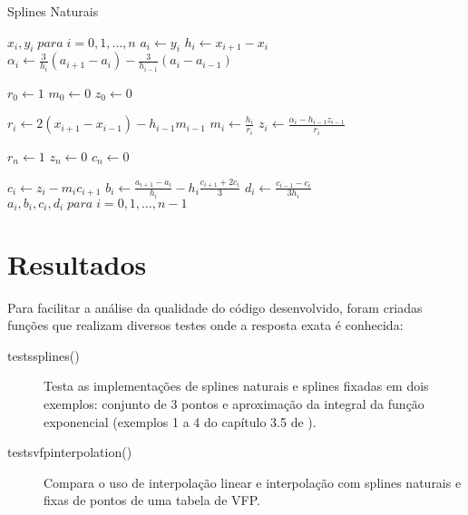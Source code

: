\documentclass[final,5p]{elsarticle}
\numberwithin{equation}{section}
\begin{document}
        \begin{algorithm}
            \caption{Splines Naturais}\label{alg:splines}
            \begin{algorithmic}
                \Require $x_i,y_i \; para \; i=0,1,\ldots,n$
                    \State $a_i \gets y_i$
                \EndFor
                    \State $h_i \gets x_{i+1} - x_i$
                \EndFor
                    \State $\alpha_i \gets \frac{3}{h_i} (a_{i+1}-a_i) - \frac{3}{h_{i-1}} (a_i-a_{i-1})$
                \EndFor
                
                \State $r_0 \gets 1$
                \State $m_0 \gets 0$
                \State $z_0 \gets 0$
                
                    \State $r_i \gets 2 (x_{i+1} - x_{i-1}) - h_{i-1} m_{i-1}$
                    \State $m_i \gets \frac{h_i}{r_i}$
                    \State $z_i \gets \frac{\alpha_i - h_{i-1} z_{i-1}}{r_i}$
                \EndFor
                
                \State $r_n \gets 1$
                \State $z_n \gets 0$
                \State $c_n \gets 0$
                
                    \State $c_i \gets z_i - m_i c_{i+1}$
                    \State $b_i \gets \frac{a_{i+1} - a_i}{h_i} - h_i \frac{c_{i+1} + 2 c_i}{3}$
                    \State $d_i \gets \frac{c_{i-1} - c_i}{3 h_i}$
                \EndFor
                \State \Return $a_i,b_i,c_i,d_i \; para \; i=0,1,\ldots,n-1$
            \end{algorithmic}
        \end{algorithm}
    
    \section{Resultados}
    
        Para facilitar a análise da qualidade do código desenvolvido, foram criadas funções que realizam diversos testes onde a resposta exata é conhecida:

        \begin{description}
            \item[tests\textunderscore splines()] Testa as implementações de splines naturais e splines fixadas em dois exemplos: conjunto de 3 pontos e aproximação da integral da função exponencial (exemplos 1 a 4 do capítulo 3.5 de \cite{burden2016analise}).
            
            \item[tests\textunderscore vfp\textunderscore interpolation()] Compara o uso de interpolação linear e interpolação com splines naturais e fixas de pontos de uma tabela de VFP.
        \end{description}
\end{document}
